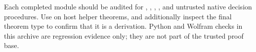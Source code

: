 Each completed module should be audited for , ,
, , and untrusted native decision procedures.
Use  on host helper theorems, and additionally inspect the
final theorem type to confirm that it is a  derivation.  Python
and Wolfram checks in this archive are regression evidence only; they are not
part of the trusted proof base.
